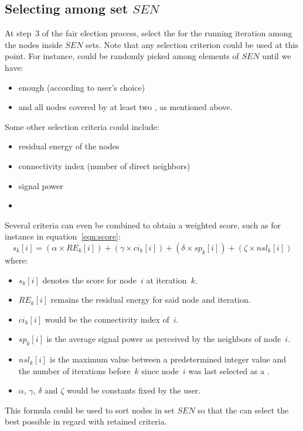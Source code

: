 \subsection{Selecting \cns among set $SEN$}

At step~3 of the fair election process, \chs select the \cns for the running iteration among the nodes inside $SEN$ sets.
Note that any selection criterion could be used at this point.
For instance, \cns could be randomly picked among elements of $SEN$ until we have:
\begin{itemize}
    \item enough \cns (according to user's choice)
    \item and all nodes covered by at least two \cns, as mentioned above.
\end{itemize}
Some other selection criteria could include:
\begin{itemize}
    \item residual energy of the nodes
    \item connectivity index (number of direct neighbors)
    \item signal power
    \item \etc
\end{itemize}
Several criteria can even be combined to obtain a weighted score, such as for instance in equation~\ref{eqn:score}:
\begin{equation}
    \label{eqn:score}
    s_k[i] = (\alpha \times RE_k[i]) + (\gamma \times ci_k[i]) + (\delta \times sp_k[i]) + (\zeta \times nsl_k[i])
\end{equation}
where:
\begin{itemize}
    \item $s_k[i]$ denotes the score for node~$i$ at iteration~$k$.
    \item $RE_k[i]$ remains the residual energy for said node and iteration.
    \item $ci_k[i]$ would be the connectivity index of~$i$.
    \item $sp_k[i]$ is the average signal power as perceived by the neighbors of node~$i$.
    \item $nsl_k[i]$ is the maximum value between a predetermined integer value and the number of iterations before~$k$ since node~$i$ was last selected as a \cn.
    \item $\alpha$, $\gamma$, $\delta$ and $\zeta$ would be constants fixed by the user.
\end{itemize}
This formula could be used to sort nodes in set $SEN$ so that the \ch can select the best possible \cns in regard with retained criteria.


